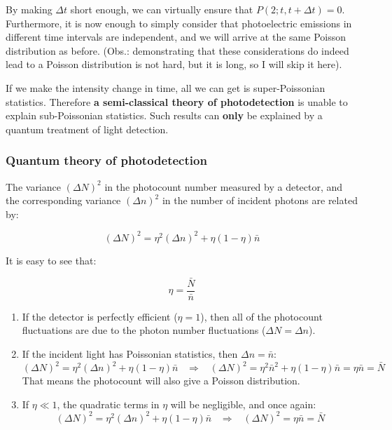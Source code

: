 \documentclass[12pt,a4paper]{report}
\begin{document}
By making $\Delta t$ short enough, we can virtually ensure that $P(2;t,t+\Delta t)=0$. Furthermore, it is now enough to simply consider that photoelectric emissions in different time intervals are independent, and we will arrive at the same Poisson distribution as before. (Obs.: demonstrating that these considerations do indeed lead to a Poisson distribution is not hard, but it is long, so I will skip it here).

If we make the intensity change in time, all we can get is super-Poissonian statistics. Therefore \textbf{a semi-classical theory of photodetection} is unable to explain sub-Poissonian statistics. Such results can \textbf{only} be explained by a quantum treatment of light detection.

\subsubsection{Quantum theory of photodetection}

The variance $(\Delta N)^2$ in the photocount number measured by a detector, and the corresponding variance $(\Delta n)^2$ in the number of incident photons are related by:

\begin{equation}
    (\Delta N)^2=\eta^2(\Delta n)^2+\eta(1-\eta)\bar{n}
\end{equation}


It is easy to see that:

\begin{equation}
    \eta=\frac{\bar{N}}{\bar{n}}
\end{equation}

\begin{enumerate}
    \item If the detector is perfectly efficient ($\eta=1$), then all of the photocount fluctuations are due to the photon number fluctuations ($\Delta N = \Delta n$).
    \item  If the incident light has Poissonian statistics, then $\Delta n=\bar{n}$:
    \begin{equation*}
        (\Delta N)^2=\eta^2(\Delta n)^2+\eta(1-\eta)\bar{n}\;\;\;\Rightarrow\;\;\;(\Delta N)^2=\eta^2\bar{n}^2+\eta(1-\eta)\bar{n}=\eta\bar{n}=\bar{N}
    \end{equation*}
    That means the photocount will also give a Poisson distribution.
    \item If $\eta\ll1$, the quadratic terms in $\eta$ will be negligible, and once again:
    \begin{equation*}
        (\Delta N)^2=\eta^2(\Delta n)^2+\eta(1-\eta)\bar{n}\;\;\;\Rightarrow\;\;\;(\Delta N)^2=\eta\bar{n}=\bar{N}
    \end{equation*}
\end{enumerate}
\end{document}

